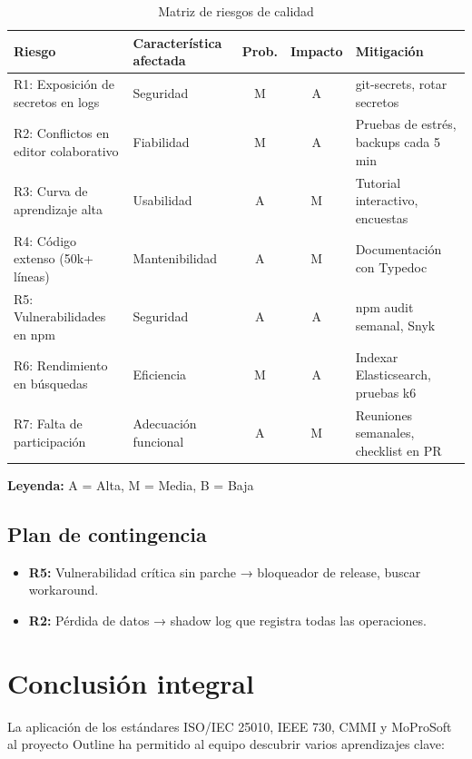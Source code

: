 \documentclass[12pt]{article}
\begin{document}
\begin{table}[H]
\centering
\footnotesize
\renewcommand{\arraystretch}{1.3}
\begin{tabularx}{\textwidth}{|l|X|c|c|X|}
\hline
\textbf{Riesgo} & \textbf{Característica afectada} & \textbf{Prob.} & \textbf{Impacto} & \textbf{Mitigación} \\ \hline
R1: Exposición de secretos en logs & Seguridad & M & A & git-secrets, rotar secretos \\ \hline
R2: Conflictos en editor colaborativo & Fiabilidad & M & A & Pruebas de estrés, backups cada 5 min \\ \hline
R3: Curva de aprendizaje alta & Usabilidad & A & M & Tutorial interactivo, encuestas \\ \hline
R4: Código extenso (50k+ líneas) & Mantenibilidad & A & M & Documentación con Typedoc \\ \hline
R5: Vulnerabilidades en npm & Seguridad & A & A & npm audit semanal, Snyk \\ \hline
R6: Rendimiento en búsquedas & Eficiencia & M & A & Indexar Elasticsearch, pruebas k6 \\ \hline
R7: Falta de participación & Adecuación funcional & A & M & Reuniones semanales, checklist en PR \\ \hline
\end{tabularx}
\caption{Matriz de riesgos de calidad}
\end{table}

\textbf{Leyenda:} A = Alta, M = Media, B = Baja

\subsection{Plan de contingencia}
\begin{itemize}
    \item \textbf{R5:} Vulnerabilidad crítica sin parche → bloqueador de release, buscar workaround.
    \item \textbf{R2:} Pérdida de datos → shadow log que registra todas las operaciones.
\end{itemize}

\newpage
\section{Conclusión integral}

La aplicación de los estándares ISO/IEC 25010, IEEE 730, CMMI y MoProSoft al proyecto Outline ha permitido al equipo descubrir varios aprendizajes clave:
\end{document}
